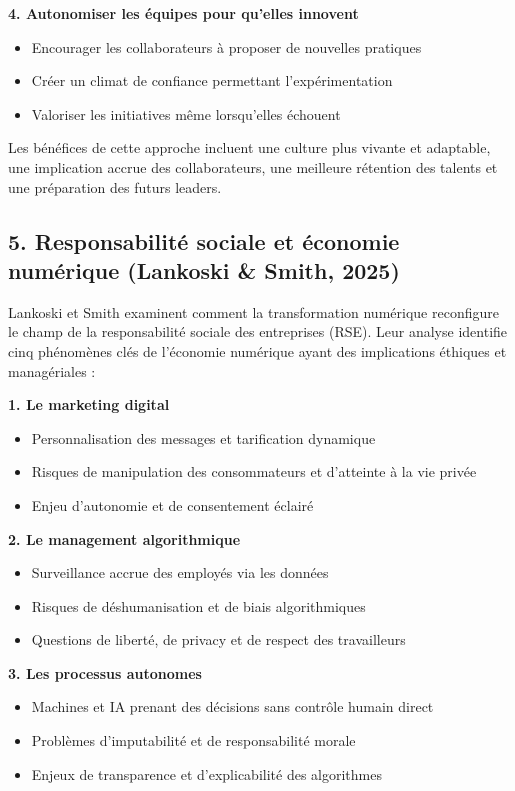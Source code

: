 \documentclass{rapportECL}
\begin{document}
\textbf{4. Autonomiser les équipes pour qu'elles innovent}
\begin{itemize}
\item Encourager les collaborateurs à proposer de nouvelles pratiques
\item Créer un climat de confiance permettant l'expérimentation
\item Valoriser les initiatives même lorsqu'elles échouent
\end{itemize}

Les bénéfices de cette approche incluent une culture plus vivante et adaptable, une implication accrue des collaborateurs, une meilleure rétention des talents et une préparation des futurs leaders.

\subsection*{5. Responsabilité sociale et économie numérique (Lankoski \& Smith, 2025)}

Lankoski et Smith examinent comment la transformation numérique reconfigure le champ de la responsabilité sociale des entreprises (RSE). Leur analyse identifie cinq phénomènes clés de l'économie numérique ayant des implications éthiques et managériales :

\textbf{1. Le marketing digital}
\begin{itemize}
\item Personnalisation des messages et tarification dynamique
\item Risques de manipulation des consommateurs et d'atteinte à la vie privée
\item Enjeu d'autonomie et de consentement éclairé
\end{itemize}

\textbf{2. Le management algorithmique}
\begin{itemize}
\item Surveillance accrue des employés via les données
\item Risques de déshumanisation et de biais algorithmiques
\item Questions de liberté, de privacy et de respect des travailleurs
\end{itemize}

\textbf{3. Les processus autonomes}
\begin{itemize}
\item Machines et IA prenant des décisions sans contrôle humain direct
\item Problèmes d'imputabilité et de responsabilité morale
\item Enjeux de transparence et d'explicabilité des algorithmes
\end{itemize}
\end{document}
